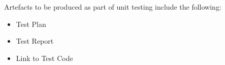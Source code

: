 Artefacts to be produced as part of unit testing include the following:
\begin{itemize}
	\item Test Plan
	\item Test Report 
	\item Link to Test Code
\end{itemize}